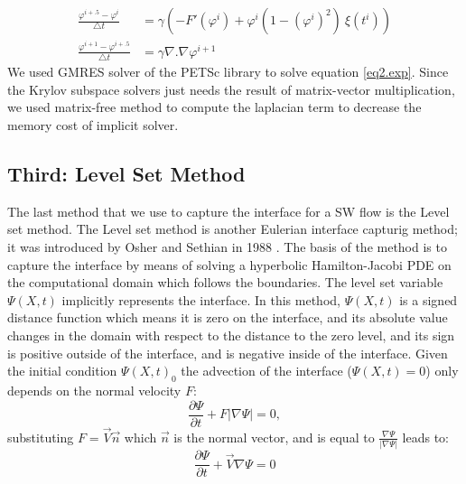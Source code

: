 \documentclass[letterpaper,10pt]{article}
\begin{document}
\begin{align}
\frac{\varphi^{i+.5}-\varphi^i}{\bigtriangleup t}&= \gamma (-F'(\varphi^i)+\varphi^i (1-(\varphi^i)^2)\ \xi(t^i)) \label{eq1.exp}\\
\frac{\varphi^{i+1}-\varphi^{i+.5}}{\bigtriangleup t} &= \gamma \nabla .\nabla \varphi^{i+1} \label{eq2.exp}
\end{align}
We used GMRES solver of the PETSc \cite{petsc-user-ref} library to solve equation \eqref{eq2.exp}. Since the Krylov subspace solvers just needs the result of matrix-vector multiplication, we used matrix-free method to compute the laplacian term to decrease the memory cost of implicit solver.
\subsection{Third: Level Set Method} \label{level set}
The last method that we use to capture the interface for a SW flow is the Level set method.
The Level set method is another Eulerian interface capturig method; it was introduced by Osher and Sethian in 1988 \cite{Osher1988}.
The basis of the method is to capture the interface by means of solving a hyperbolic Hamilton-Jacobi PDE on 
the computational domain which follows the boundaries. The level set variable $\varPsi (X,t)$ implicitly represents the interface. In this method, $\varPsi (X,t)$ is a signed distance function which means it is zero on the interface, and its absolute value changes in the domain with respect to the distance to the zero level, and its sign is positive outside of the interface, and is negative inside of the interface. 
Given the initial condition $\varPsi (X,t)_0$ the advection of the interface ($\varPsi (X,t)=0$) only depends on the normal velocity $F$:
\begin{equation}\label{levelseteq1}
        \frac{\partial \varPsi}{\partial t} + F |\nabla \varPsi| = 0,
\end{equation}
substituting $F = \overrightarrow{V} \overrightarrow{n} $ which  $\overrightarrow{n} $ is the normal vector, and is equal to
$ \frac{\nabla \varPsi}{|\nabla \varPsi|}$ leads to:
\begin{equation}\label{levelseteq2}
        \frac{\partial \varPsi}{\partial t} + \overrightarrow{V} \nabla \varPsi = 0
\end{equation}
\end{document}
